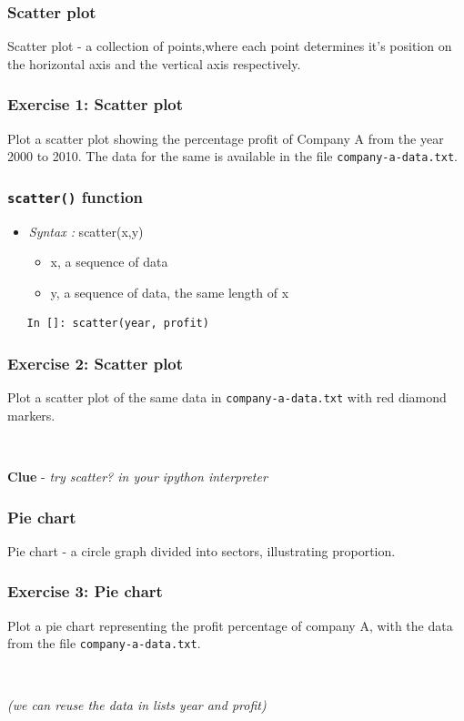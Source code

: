 \documentclass[presentation]{beamer}
\begin{document}
\begin{frame}
\frametitle{Scatter plot}
\label{sec-4}

  Scatter plot - a collection of points,where each point determines
  it's position on the horizontal axis and the vertical axis 
  respectively.
\end{frame}
\begin{frame}
\frametitle{Exercise 1: Scatter plot}
\label{sec-5}

  Plot a scatter plot showing the percentage profit of Company A from the year 2000
  to 2010. The data for the same is available in the file \verb~company-a-data.txt~.
\end{frame}
\begin{frame}[fragile]
\frametitle{\verb~scatter()~ function}
\label{sec-6}


\begin{itemize}
\item \emph{Syntax :} scatter(x,y)
\begin{itemize}
\item x, a sequence of data
\item y, a sequence of data, the same length of x
\end{itemize}
\end{itemize}
\begin{verbatim}
   In []: scatter(year, profit)
\end{verbatim}
\end{frame}
\begin{frame}[fragile]
\frametitle{Exercise 2: Scatter plot}
\label{sec-7}

  Plot a scatter plot of the same data in \verb~company-a-data.txt~ with red diamond markers.
\begin{verbatim}
   
\end{verbatim}

  \textbf{Clue} - \emph{try scatter? in your ipython interpreter}
\end{frame}
\begin{frame}
\frametitle{Pie chart}
\label{sec-8}

  Pie chart - a circle graph divided into sectors, illustrating proportion. 
\end{frame}
\begin{frame}[fragile]
\frametitle{Exercise 3: Pie chart}
\label{sec-9}

  Plot a pie chart representing the profit percentage of company A, with the data 
  from the file \verb~company-a-data.txt~.
\begin{verbatim}
   
\end{verbatim}

  \emph{(we can reuse the data in lists year and profit)}
\end{frame}
\end{document}
